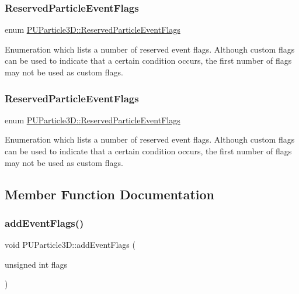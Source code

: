 \subsubsection{\texorpdfstring{Reserved\+Particle\+Event\+Flags}{ReservedParticleEventFlags}\hspace{0.1cm}{\footnotesize\ttfamily [1/2]}}
{\footnotesize\ttfamily enum \hyperlink{structPUParticle3D_a2889eb4db1dc86b0bd60c411c7f8c657}{P\+U\+Particle3\+D\+::\+Reserved\+Particle\+Event\+Flags}}

Enumeration which lists a number of reserved event flags. Although custom flags can be used to indicate that a certain condition occurs, the first number of flags may not be used as custom flags. \mbox{\label{structPUParticle3D_a2889eb4db1dc86b0bd60c411c7f8c657}} 
\subsubsection{\texorpdfstring{Reserved\+Particle\+Event\+Flags}{ReservedParticleEventFlags}\hspace{0.1cm}{\footnotesize\ttfamily [2/2]}}
{\footnotesize\ttfamily enum \hyperlink{structPUParticle3D_a2889eb4db1dc86b0bd60c411c7f8c657}{P\+U\+Particle3\+D\+::\+Reserved\+Particle\+Event\+Flags}}

Enumeration which lists a number of reserved event flags. Although custom flags can be used to indicate that a certain condition occurs, the first number of flags may not be used as custom flags. 

\subsection{Member Function Documentation}
\mbox{\label{structPUParticle3D_a773a59d4e9b2c7f89486b0c8168a8330}} 
\subsubsection{\texorpdfstring{add\+Event\+Flags()}{addEventFlags()}\hspace{0.1cm}{\footnotesize\ttfamily [1/2]}}
{\footnotesize\ttfamily void P\+U\+Particle3\+D\+::add\+Event\+Flags (\begin{DoxyParamCaption}\item[{unsigned int}]{flags }\end{DoxyParamCaption})\hspace{0.3cm}{\ttfamily [inline]}}

